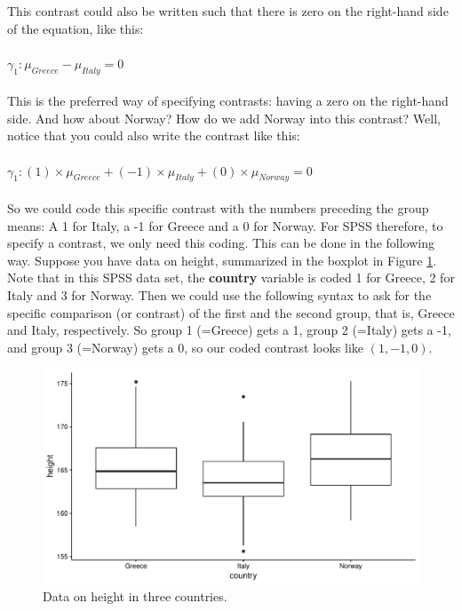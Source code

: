 \documentclass[]{book}\usepackage[]{graphicx}\usepackage[]{color}
\makeatletter
\def\maxwidth{ %
  \ifdim\Gin@nat@width>\linewidth
    \linewidth
  \else
    \Gin@nat@width
  \fi
}
\newenvironment{knitrout}{}{} %
\makeatother
\begin{document}
This contrast could also be written such that there is zero on the right-hand side of the equation, like this:
\\
\\
$\gamma_1: \mu_{Greece}-\mu_{Italy}=0$
\\
\\
This is the preferred way of specifying contrasts: having a zero on the right-hand side. And how about Norway? How do we add Norway into this contrast? Well, notice that you could also write the contrast like this:
\\
\\
$\gamma_1: (1)\times \mu_{Greece} + (-1) \times \mu_{Italy} + (0) \times \mu_{Norway} =0$
\\
\\
So we could code this specific contrast with the numbers preceding the group means: A 1 for Italy, a -1 for Greece and a 0 for Norway. For SPSS therefore, to specify a contrast, we only need this coding. This can be done in the following way. Suppose you have data on height, summarized in the boxplot in Figure \ref{fig:fig1416}. Note that in this SPSS data set, the \textbf{country} variable is coded 1 for Greece, 2 for Italy and 3 for Norway. Then we could use the following syntax to ask for the specific comparison (or contrast) of the first and the second group, that is, Greece and Italy, respectively. So group 1 (=Greece) gets a 1, group 2 (=Italy) gets a -1, and group 3 (=Norway) gets a 0, so our coded contrast looks like $(1, -1, 0)$.



\begin{knitrout}
\color{fgcolor}\begin{figure}

{\centering \includegraphics[width=\maxwidth]{figure/fig1416-1} 

}

\caption[Data on height in three countries]{Data on height in three countries.}\label{fig:fig1416}
\end{figure}


\end{knitrout}
\end{document}
